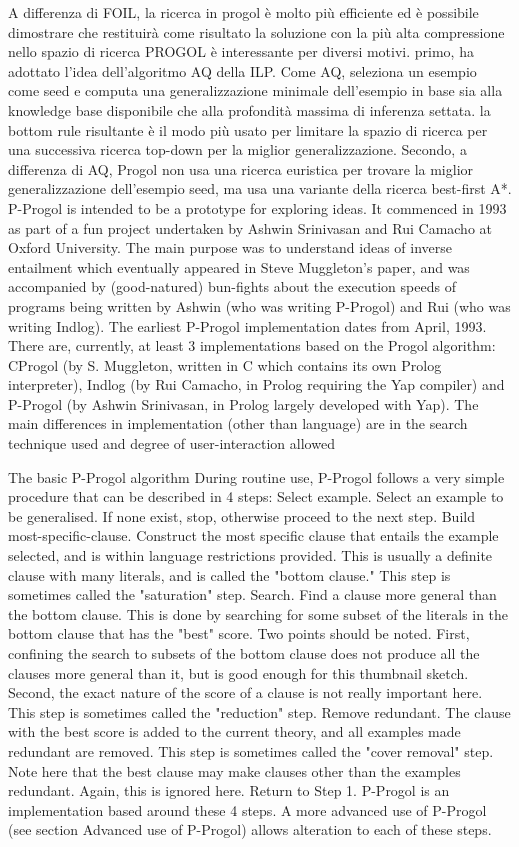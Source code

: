 A differenza di FOIL, la ricerca in progol è molto più efficiente ed è possibile dimostrare che restituirà come risultato la soluzione con la più alta compressione nello spazio di ricerca 
PROGOL è interessante per diversi motivi. primo, ha adottato l'idea dell'algoritmo AQ della ILP. Come AQ, seleziona un esempio come seed e computa una generalizzazione minimale dell'esempio in base sia alla knowledge base disponibile che alla profondità massima di inferenza settata. la bottom rule risultante è il modo più usato per limitare la spazio di ricerca per una successiva ricerca top-down per la miglior generalizzazione.
Secondo, a differenza di AQ, Progol non usa una ricerca euristica per trovare la miglior generalizzazione dell'esempio seed, ma usa una variante della ricerca best-first A*.
\nocite{wiki:progol}
P-Progol is intended to be a prototype for exploring ideas. It commenced in 1993 as part of a fun project undertaken by Ashwin Srinivasan and Rui Camacho at Oxford University. The main purpose was to understand ideas of inverse entailment which eventually appeared in Steve Muggleton's paper, and was accompanied by (good-natured) bun-fights about the execution speeds of programs being written by Ashwin (who was writing P-Progol) and Rui (who was writing Indlog). The earliest P-Progol implementation dates from April, 1993. There are, currently, at least 3 implementations based on the Progol algorithm: CProgol (by S. Muggleton, written in C which contains its own Prolog interpreter), Indlog (by Rui Camacho, in Prolog requiring the Yap compiler) and P-Progol (by Ashwin Srinivasan, in Prolog largely developed with Yap). The main differences in implementation (other than language) are in the search technique used and degree of user-interaction allowed

The basic P-Progol algorithm
During routine use, P-Progol follows a very simple procedure that can be described in 4 steps:
Select example. Select an example to be generalised. If none exist, stop, otherwise proceed to the next step.
Build most-specific-clause. Construct the most specific clause that entails the example selected, and is within language restrictions provided. This is usually a definite clause with many literals, and is called the "bottom clause." This step is sometimes called the "saturation" step.
Search. Find a clause more general than the bottom clause. This is done by searching for some subset of the literals in the bottom clause that has the "best" score. Two points should be noted. First, confining the search to subsets of the bottom clause does not produce all the clauses more general than it, but is good enough for this thumbnail sketch. Second, the exact nature of the score of a clause is not really important here. This step is sometimes called the "reduction" step.
Remove redundant. The clause with the best score is added to the current theory, and all examples made redundant are removed. This step is sometimes called the "cover removal" step. Note here that the best clause may make clauses other than the examples redundant. Again, this is ignored here. Return to Step 1.
P-Progol is an implementation based around these 4 steps. A more advanced use of P-Progol (see section Advanced use of P-Progol) allows alteration to each of these steps.

